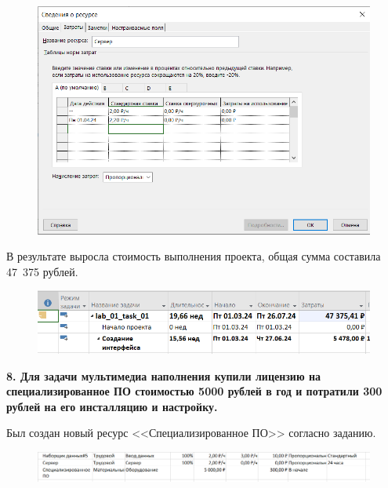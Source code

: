 \begin{figure}[h!]
	\begin{center}
		\includegraphics[scale=0.65]{inc/img/p_20.png}
	\end{center}
	\captionsetup{justification=centering}
	\label{fig:u3}
\end{figure}

В результате выросла стоимость выполнения проекта, общая сумма составила 47~375 рублей.

\begin{figure}[h!]
	\begin{center}
		\includegraphics[scale=0.7]{inc/img/p_21.png}
	\end{center}
	\captionsetup{justification=centering}
	\label{fig:u3}
\end{figure}

\newpage

\textbf{8. Для задачи мультимедиа наполнения купили лицензию на специализированное ПО стоимостью 5000 рублей в год и потратили 300 рублей на его инсталляцию и настройку.}

Был создан новый ресурс <<Специализированное ПО>> согласно заданию.

\begin{figure}[h!]
	\begin{center}
		\includegraphics[scale=0.5]{inc/img/p_22.png}
	\end{center}
	\captionsetup{justification=centering}
	\label{fig:u3}
\end{figure}

